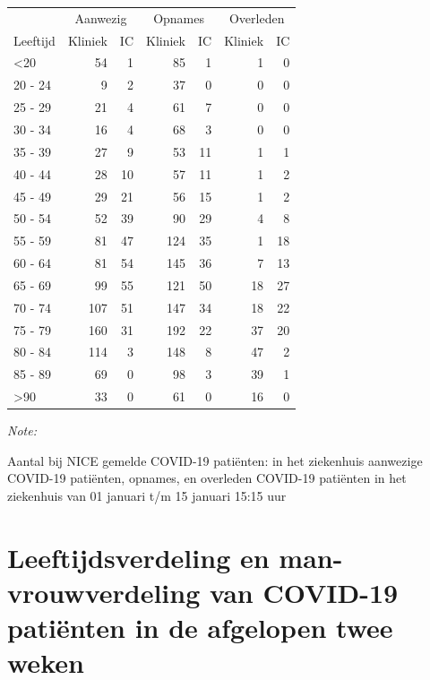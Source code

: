 \documentclass[
  english,
  man,floatsintext]{apa6}
\begin{document}
\begin{table}
\centering\begingroup\fontsize{10}{12}\selectfont

\begin{threeparttable}
\begin{tabular}{lrrrrrr}
\toprule
\multicolumn{1}{c}{ } & \multicolumn{2}{c}{Aanwezig} & \multicolumn{2}{c}{Opnames} & \multicolumn{2}{c}{Overleden} \\
\cmidrule(l{3pt}r{3pt}){2-3} \cmidrule(l{3pt}r{3pt}){4-5} \cmidrule(l{3pt}r{3pt}){6-7}
Leeftijd & Kliniek & IC & Kliniek & IC & Kliniek & IC\\
\midrule
<20 & 54 & 1 & 85 & 1 & 1 & 0\\
20 - 24 & 9 & 2 & 37 & 0 & 0 & 0\\
25 - 29 & 21 & 4 & 61 & 7 & 0 & 0\\
30 - 34 & 16 & 4 & 68 & 3 & 0 & 0\\
35 - 39 & 27 & 9 & 53 & 11 & 1 & 1\\
40 - 44 & 28 & 10 & 57 & 11 & 1 & 2\\
45 - 49 & 29 & 21 & 56 & 15 & 1 & 2\\
50 - 54 & 52 & 39 & 90 & 29 & 4 & 8\\
55 - 59 & 81 & 47 & 124 & 35 & 1 & 18\\
60 - 64 & 81 & 54 & 145 & 36 & 7 & 13\\
65 - 69 & 99 & 55 & 121 & 50 & 18 & 27\\
70 - 74 & 107 & 51 & 147 & 34 & 18 & 22\\
75 - 79 & 160 & 31 & 192 & 22 & 37 & 20\\
80 - 84 & 114 & 3 & 148 & 8 & 47 & 2\\
85 - 89 & 69 & 0 & 98 & 3 & 39 & 1\\
>90 & 33 & 0 & 61 & 0 & 16 & 0\\
\bottomrule
\end{tabular}
\begin{tablenotes}
\item \textit{Note: } 
\item Aantal bij NICE gemelde COVID-19 patiënten: in het ziekenhuis aanwezige COVID-19 patiënten, opnames, en overleden COVID-19 patiënten in het ziekenhuis van 01 januari t/m 15 januari 15:15 uur
\end{tablenotes}
\end{threeparttable}
\endgroup{}
\end{table}

\newpage

\hypertarget{leeftijdsverdeling-en-man-vrouwverdeling-van-covid-19-patiuxebnten-in-de-afgelopen-twee-weken}{%
\section{Leeftijdsverdeling en man-vrouwverdeling van COVID-19 patiënten in de afgelopen twee weken}\label{leeftijdsverdeling-en-man-vrouwverdeling-van-covid-19-patiuxebnten-in-de-afgelopen-twee-weken}}
\end{document}
